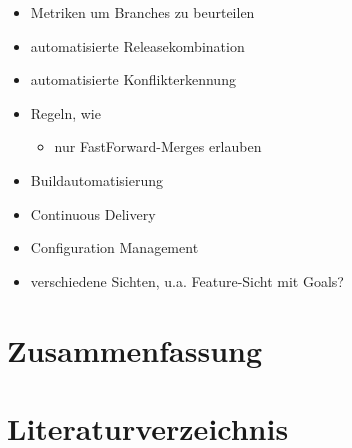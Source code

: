 \documentclass[10pt,a4paper]{book}
\begin{document}
\begin{itemize}
\item Metriken um Branches zu beurteilen
\item automatisierte Releasekombination
\item automatisierte Konflikterkennung
\item Regeln, wie 
	\begin{itemize}
		\item nur FastForward-Merges erlauben
	\end{itemize}	 
\item Buildautomatisierung
\item Continuous Delivery
\item Configuration Management
\item verschiedene Sichten, u.a. Feature-Sicht mit Goals?
\end{itemize}

\chapter{Zusammenfassung}


\chapter{Literaturverzeichnis}

\printbibliography
\end{document}
